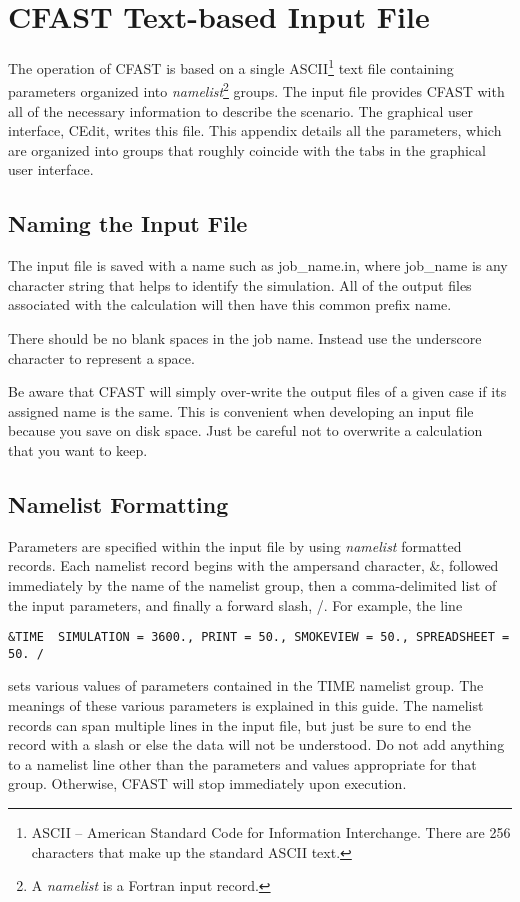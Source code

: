 \chapter{CFAST Text-based Input File}

The operation of CFAST is based on a single ASCII\footnote{ASCII -- American Standard Code for Information Interchange. There are 256 characters that make up the standard ASCII text.} text file containing parameters organized into {\em namelist}\footnote{A {\em namelist} is a Fortran input record.} groups.
The input file provides CFAST  with all of the necessary information to describe the scenario. The graphical user interface, CEdit, writes this file. This appendix details all the parameters, which are organized into groups that roughly coincide with the tabs in the graphical user interface.

\section{Naming the Input File}

The input file is saved with a name such as {\ct job\_name.in}, where {\ct job\_name} is any character string that helps to identify the simulation. All of the output files associated with the calculation will then have this common prefix name.

There should be no blank spaces in the job name. Instead use the underscore character to represent a space.

Be aware that CFAST will simply over-write the output files of a given case if its assigned name is the same. This is convenient when developing an input file because you save on disk space. Just be careful not to overwrite a calculation that you want to keep.

\section{Namelist Formatting}

Parameters are specified within the input file by using {\em namelist} formatted records. Each namelist record begins with the ampersand character, {\ct \&}, followed immediately by the name of the namelist group, then a comma-delimited list of the input parameters, and finally a forward slash, {\ct /}. For example, the line
\begin{lstlisting}
&TIME  SIMULATION = 3600., PRINT = 50., SMOKEVIEW = 50., SPREADSHEET = 50. /
\end{lstlisting}
sets various values of parameters contained in the {\ct TIME} namelist group. The meanings of these various parameters is explained in this guide. The namelist records can span multiple lines in the input file, but just be sure to end the record with a slash or else the data will not be understood. Do not add anything to a namelist line other than the parameters and values appropriate for that group. Otherwise, CFAST will stop immediately upon execution.

